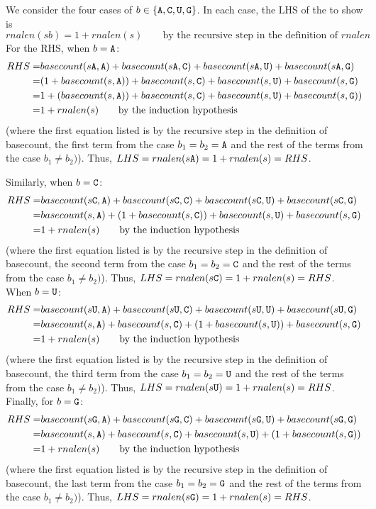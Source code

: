 \begin{description}
\begin{enumerate}
{\begin{itemize}
  We consider the four cases of $b \in \{ \texttt{A}, \texttt{C}, \texttt{U}, \texttt{G} \}$. In each case, the LHS of the to show is
  \[
  rnalen(sb) = 1 + rnalen(s) \qquad\text{by the recursive step in the  definition of $rnalen$}
  \]
  For the RHS, when $b = \texttt{A}$:
  \begin{align*}
  RHS = &basecount(s\texttt{A},\texttt{A}) + basecount(s\texttt{A},\texttt{C}) + basecount(s\texttt{A},\texttt{U}) + basecount(s\texttt{A},\texttt{G}) \\
  = &(1 + basecount(s,\texttt{A})) + basecount(s,\texttt{C}) +basecount(s,\texttt{U}) + basecount(s,\texttt{G}) \\
  = &1 + ( basecount(s,\texttt{A})) + basecount(s,\texttt{C}) +basecount(s,\texttt{U}) + basecount(s,\texttt{G}) ) \\
  = &1 + rnalen(s)  \qquad \text{by the induction hypothesis}
  \end{align*}
  (where the first equation listed is by the recursive step in the definition of basecount, the first term 
  from the case $b_1 = b_2 = \texttt{A}$  and the rest of the terms from the case $b_1 \neq b_2)$).
  Thus, 
  $LHS = rnalen(s\texttt{A})  = 1+ rnalen(s) = RHS$.
  
  Similarly, when $b = \texttt{C}$:
  \begin{align*}
  RHS = &basecount(s\texttt{C},\texttt{A}) + basecount(s\texttt{C},\texttt{C}) + basecount(s\texttt{C},\texttt{U}) + basecount(s\texttt{C},\texttt{G}) \\
  = &basecount(s,\texttt{A}) + ( 1+ basecount(s,\texttt{C}) ) +basecount(s,\texttt{U}) + basecount(s,\texttt{G}) \\
  = &1 + rnalen(s)  \qquad \text{by the induction hypothesis}
  \end{align*}
  (where the first equation listed is by the recursive step in the definition of basecount, the second term 
  from the case $b_1 = b_2 = \texttt{C}$  and the rest of the terms from the case $b_1 \neq b_2)$).
  Thus, 
  $LHS = rnalen(s\texttt{C})  = 1+ rnalen(s) = RHS$. When $b = \texttt{U}$:
  \begin{align*}
  RHS = &basecount(s\texttt{U},\texttt{A}) + basecount(s\texttt{U},\texttt{C}) + basecount(s\texttt{U},\texttt{U}) + basecount(s\texttt{U},\texttt{G}) \\
  = &basecount(s,\texttt{A}) + basecount(s,\texttt{C}) + ( 1 + basecount(s,\texttt{U})) + basecount(s,\texttt{G}) \\
  = &1 + rnalen(s)  \qquad \text{by the induction hypothesis}
  \end{align*}
  (where the first equation listed is by the recursive step in the definition of basecount, the third term 
  from the case $b_1 = b_2 = \texttt{U}$  and the rest of the terms from the case $b_1 \neq b_2)$).
  Thus, 
  $LHS = rnalen(s\texttt{U})  = 1+ rnalen(s) = RHS$. Finally, for $b = \texttt{G}$:
  \begin{align*}
  RHS = &basecount(s\texttt{G},\texttt{A}) + basecount(s\texttt{G},\texttt{C}) + basecount(s\texttt{G},\texttt{U}) + basecount(s\texttt{G},\texttt{G}) \\
  = &basecount(s,\texttt{A}) + basecount(s,\texttt{C})  + basecount(s,\texttt{U}) + ( 1+ basecount(s,\texttt{G}) )\\
  = &1 + rnalen(s)  \qquad \text{by the induction hypothesis}
  \end{align*}
  (where the first equation listed is by the recursive step in the definition of basecount, the last term 
  from the case $b_1 = b_2 = \texttt{G}$  and the rest of the terms from the case $b_1 \neq b_2)$).
  Thus, 
  $LHS = rnalen(s\texttt{G})  = 1+ rnalen(s) = RHS$.
  

\end{itemize}}
\end{enumerate}
\end{description}
